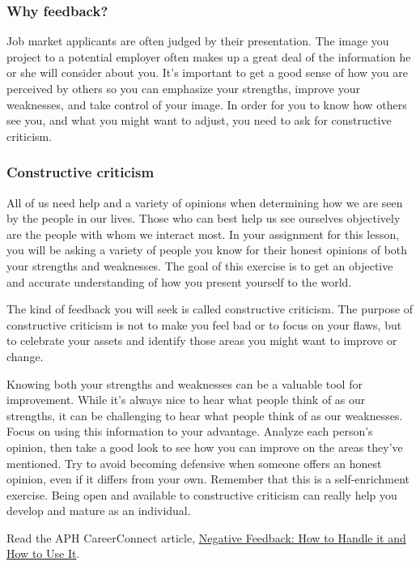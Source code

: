 \subsubsection*{Why feedback?}
Job market applicants are often judged by their presentation. The image you project to a potential employer often makes up a great deal of the information he or she will consider about you. It's important to get a good sense of how you are perceived by others so you can emphasize your strengths, improve your weaknesses, and take control of your image. In order for you to know how others see you, and what you might want to adjust, you need to ask for constructive criticism.
\subsubsection*{Constructive criticism}
All of us need help and a variety of opinions when determining how we are seen by the people in our lives. Those who can best help us see ourselves objectively are the people with whom we interact most. In your assignment for this lesson, you will be asking a variety of people you know for their honest opinions of both your strengths and weaknesses. The goal of this exercise is to get an objective and accurate understanding of how you present yourself to the world.

The kind of feedback you will seek is called constructive criticism. The purpose of constructive criticism is not to make you feel bad or to focus on your flaws, but to celebrate your assets and identify those areas you might want to improve or change.

Knowing both your strengths and weaknesses can be a valuable tool for improvement. While it's always nice to hear what people think of as our strengths, it can be challenging to hear what people think of as our weaknesses. Focus on using this information to your advantage. Analyze each person's opinion, then take a good look to see how you can improve on the areas they've mentioned. Try to avoid becoming defensive when someone offers an honest opinion, even if it differs from your own. Remember that this is a self-enrichment exercise. Being open and available to constructive criticism can really help you develop and mature as an individual.

Read the APH CareerConnect article, \href{https://aphconnectcenter.org/self-advocacy/negative-feedback-how-to-handle-it-and-how-to-use-it/}{Negative Feedback: How to Handle it and How to Use It}.

